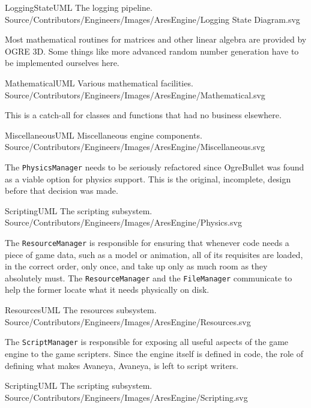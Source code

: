\FullPageDiagram
    {LoggingStateUML}
    {The logging pipeline.}
    {Source/Contributors/Engineers/Images/AresEngine/Logging State Diagram.svg}

\page 
{}
Most mathematical routines for matrices and other linear algebra are provided by OGRE 3D. Some things like more advanced random number generation have to be implemented ourselves here.

\FullPageDiagram
    {MathematicalUML}
    {Various mathematical facilities.}
    {Source/Contributors/Engineers/Images/AresEngine/Mathematical.svg}

\page 
{}
This is a catch-all for classes and functions that had no business elsewhere.

\FullPageDiagram
    {MiscellaneousUML}
    {Miscellaneous engine components.}
    {Source/Contributors/Engineers/Images/AresEngine/Miscellaneous.svg}

\page 
{}
The {\tt PhysicsManager} needs to be seriously refactored since OgreBullet was found as a viable option for physics support. This is the original, incomplete, design before that decision was made.

\FullPageDiagram
    {ScriptingUML}
    {The scripting subsystem.}
    {Source/Contributors/Engineers/Images/AresEngine/Physics.svg}

\page 
{}
The {\tt ResourceManager} is responsible for ensuring that whenever code needs a piece of game data, such as a model or animation, all of its requisites are loaded, in the correct order, only once, and take up only as much room as they absolutely must. The {\tt ResourceManager} and the {\tt FileManager} communicate to help the former locate what it needs physically on disk.

\FullPageDiagram
    {ResourcesUML}
    {The resources subsystem.}
    {Source/Contributors/Engineers/Images/AresEngine/Resources.svg}

\page 
{}
The {\tt ScriptManager} is responsible for exposing all useful aspects of the game engine to the game scripters. Since the engine itself is defined in code, the role of defining what makes Avaneya, Avaneya, is left to script writers.

\FullPageDiagram
    {ScriptingUML}
    {The scripting subsystem.}
    {Source/Contributors/Engineers/Images/AresEngine/Scripting.svg}

